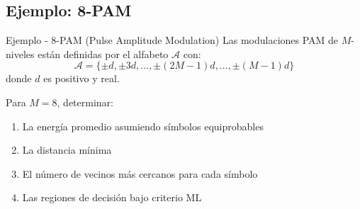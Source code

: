 \documentclass[10pt,a4paper]{article}
\begin{document}
\newpage
\subsection{Ejemplo: 8-PAM}

\begin{ejemplo}{Ejemplo - 8-PAM (Pulse Amplitude Modulation)}
Las modulaciones PAM de $M$-niveles están definidas por el alfabeto $\mathcal{A}$ con:
\[
\mathcal{A} = \{\pm d, \pm 3d, \ldots, \pm(2M-1)d, \ldots, \pm(M-1)d\}
\]
donde $d$ es positivo y real.

Para $M = 8$, determinar:
\begin{enumerate}
\item La energía promedio asumiendo símbolos equiprobables
\item La distancia mínima
\item El número de vecinos más cercanos para cada símbolo
\item Las regiones de decisión bajo criterio ML
\end{enumerate}
\end{ejemplo}
\end{document}
